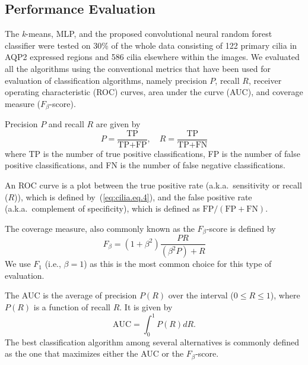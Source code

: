 \subsection{Performance Evaluation}
The \emph{k}-means, MLP, and the proposed convolutional neural random forest classifier were tested on 30\% of the whole data consisting of 122 primary cilia in AQP2 expressed regions and 586 cilia elsewhere within the images. We evaluated all the algorithms using the conventional metrics that have been used for evaluation of classification algorithms, namely precision $P$, recall $R$, receiver operating characteristic (ROC) curves, area under the curve (AUC), and coverage measure ($F_{\beta}$-score).

Precision $P$ and recall $R$ are given by
\begin{equation}
P = \frac{\text{TP}}{\text{TP} + \text{FP}}, \quad R = \frac{\text{TP}}{\text{TP} + \text{FN}}
\label{eq:cilia.eq.4}
\end{equation}
where TP is the number of true positive classifications, FP is the number of false positive classifications, and FN is the number of false negative classifications.

An ROC curve is a plot between the true positive rate (a.k.a.\ sensitivity or recall ($R$)), which is defined by~(\ref{eq:cilia.eq.4}), and the false positive rate (a.k.a.\ complement of specificity), which is defined as $\text{FP}/(\text{FP} + \text{FN})$.

The coverage measure, also commonly known as the $F_{\beta}$-score is defined by
\begin{equation}
F_{\beta} = \left(1 + \beta^{2}\right)\frac{PR}{\left(\beta^{2}P\right) + R}
\label{eq:cilia.eq.5}
\end{equation}
We use $F_{1}$ (i.e., $\beta = 1$) as this is the most common choice for this type of evaluation.

The AUC is the average of precision $P(R)$ over the interval ($0 \leq R \leq 1$), where $P(R)$ is a function of recall $R$. It is given by
\begin{equation}
\text{AUC} = \int_{0}^{1} P(R)dR.
\label{eq:cilia.eq.6}
\end{equation}
The best classification algorithm among several alternatives is commonly defined as the one that maximizes either the AUC  or the $F_{\beta}$-score.

